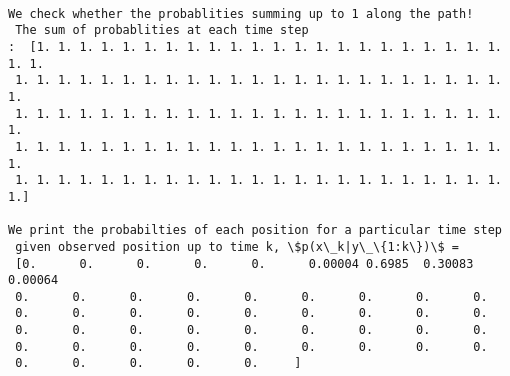 \documentclass[11pt]{article}
\begin{document}
    \begin{Verbatim}[commandchars=\\\{\}]

We check whether the probablities summing up to 1 along the path! 
 The sum of probablities at each time step 
:  [1. 1. 1. 1. 1. 1. 1. 1. 1. 1. 1. 1. 1. 1. 1. 1. 1. 1. 1. 1. 1. 1. 1. 1.
 1. 1. 1. 1. 1. 1. 1. 1. 1. 1. 1. 1. 1. 1. 1. 1. 1. 1. 1. 1. 1. 1. 1. 1.
 1. 1. 1. 1. 1. 1. 1. 1. 1. 1. 1. 1. 1. 1. 1. 1. 1. 1. 1. 1. 1. 1. 1. 1.
 1. 1. 1. 1. 1. 1. 1. 1. 1. 1. 1. 1. 1. 1. 1. 1. 1. 1. 1. 1. 1. 1. 1. 1.
 1. 1. 1. 1. 1. 1. 1. 1. 1. 1. 1. 1. 1. 1. 1. 1. 1. 1. 1. 1. 1. 1. 1. 1.]

We print the probabilties of each position for a particular time step 
 given observed position up to time k, \$p(x\_k|y\_\{1:k\})\$ =  
 [0.      0.      0.      0.      0.      0.00004 0.6985  0.30083 0.00064
 0.      0.      0.      0.      0.      0.      0.      0.      0.
 0.      0.      0.      0.      0.      0.      0.      0.      0.
 0.      0.      0.      0.      0.      0.      0.      0.      0.
 0.      0.      0.      0.      0.      0.      0.      0.      0.
 0.      0.      0.      0.      0.     ]

    \end{Verbatim}
\end{document}
